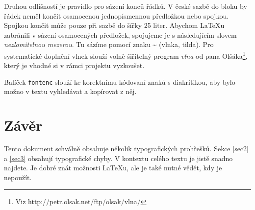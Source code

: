 \documentclass[hidelinks, twocolumn, a4paper]{article}
\begin{document}
Druhou odlišností je pravidlo pro sázení konců řádků.
V české sazbě do bloku by řádek neměl končit osamocenou jednopísmennou předložkou nebo spojkou.
Spojkou  končit může pouze při sazbě do šířky 25 liter.
Abychom \LaTeX u zabránili v sázení osamocených předložek, spojujeme je s následujícím slovem {\itshape nezlomitelnou mezerou}.
Tu sázíme pomocí znaku \~{} (vlnka, tilda).
Pro systematické doplnění vlnek slouží volně šiřitelný program {\itshape vlna} od pana Olšáka\footnote{Viz \selectfont http://petr.olsak.net/ftp/olsak/vlna/}, který je vhodné si v rámci projektu vyzkoušet.

Balíček \verb|fontenc| slouží ke korektnímu kódovaní znaků s diakritikou, aby bylo možno v textu vyhledávat a kopírovat z něj.

\section{Závěr}
\label{sec5}

Tento dokument schválně obsahuje několik typografických prohřešků.
Sekce \ref{sec2} a \ref{sec3} obsahují typografické chyby.
V kontextu celého textu je jistě snadno najdete.
Je dobré znát možnosti \LaTeX u, ale je také nutné vědět, kdy je nepoužít.

\end{document}
